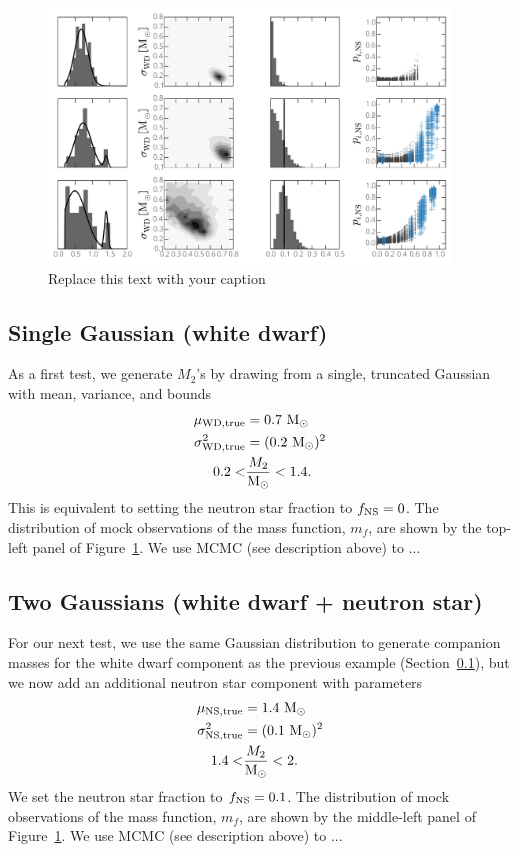 \documentclass[apjl]{emulateapj}
\newcommand{\Msun}{\ifmmode {{\rm M}_{\odot}}\else M$_{\odot}$\fi}
\begin{document}
\begin{figure}[h!]
\begin{center}
\includegraphics[width=0.95\textwidth]{many-panel.pdf}
\caption{Replace this text with your caption}
\label{fig:tests}
\end{center}
\end{figure}


\subsection{Single Gaussian (white dwarf)} \label{sec:exp1}

As a first test, we generate $M_2$'s by drawing from a single, truncated Gaussian with mean, variance, and bounds
\begin{align}
	\mu_{\rm WD, true} &= 0.7~\Msun\\
	\sigma^2_{\rm WD, true} &= (0.2~\Msun)^2\\
	0.2 < &\frac{M_2}{\Msun} < 1.4.
\end{align}
This is equivalent to setting the neutron star fraction to $f_{\rm NS} = 0$. The distribution of mock observations of the mass function, $m_f$, are shown by the top-left panel of Figure~\ref{fig:tests}. We use MCMC (see description above) to ... 

\subsection{Two Gaussians (white dwarf + neutron star)} \label{sec:exp2}
For our next test, we use the same Gaussian distribution to generate companion masses for the white dwarf component as the previous example (Section~\ref{sec:exp1}), but we now add an additional neutron star component with parameters
\begin{align}
	\mu_{\rm NS, true} &= 1.4~\Msun\\
	\sigma^2_{\rm NS, true} &= (0.1~\Msun)^2\\
	1.4 < & \frac{M_2}{\Msun} < 2.
\end{align}
We set the neutron star fraction to $f_{\rm NS} = 0.1$. The distribution of mock observations of the mass function, $m_f$, are shown by the middle-left panel of Figure~\ref{fig:tests}. We use MCMC (see description above) to ...
\end{document}
